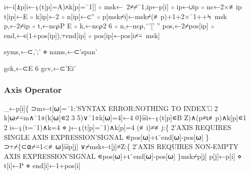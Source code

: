 \documentclass{article}%
\begin{document}
\nwenddocs{}\endmoddef\nwstartdeflinemarkup{}\nwenddeflinemarkup
i←i[⍋p[i←⍸(t[p]=A)∧k[p]=¯1]] ⋄ msk←~2≠⌿¯1,ip←p[i] ⋄ ip←∪ip ⋄ nc←2×≢ip
t[ip]←E ⋄ k[ip]←2 ⋄ n[ip]←⊂'' ⋄ p[msk⌿i]←msk⌿(≢p)+1+2×¯1++⍀~msk
p,←2⌿ip ⋄ t,←nc⍴P E ⋄ k,←nc⍴2 6 ⋄ n,←nc⍴,¨'[' ''
pos,←2⌿pos[ip] ⋄ end,←∊(1+pos[ip]),⍪end[ip] ⋄ pos[ip]←pos[i⌿⍨~msk]
\nwendcode{}\nwdocspar

\nwenddocs{}\plusendmoddef\nwstartdeflinemarkup{}\nwenddeflinemarkup
syms,←⊂,';' ⋄ nams,←⊂'span'
\nwendcode{}\nwdocspar

\nwenddocs{}\plusendmoddef\nwstartdeflinemarkup{}\nwenddeflinemarkup
gck,←⊂E 6
gcv,←⊂'Ei'
\nwendcode{}\nwdocspar


\subsubsection{Axis Operator}

\nwenddocs{}\endmoddef\nwstartdeflinemarkup{}\nwenddeflinemarkup
_←p[i]\{
        ⊃m←t[⍵]=¯1:'SYNTAX ERROR:NOTHING TO INDEX'⎕ 2
        k[⍵⌿⍨m∧¯1⌽(k[⍵]∊2 3 5)∨¯1⌽k[⍵]=4]←4
0\}⌸i←⍸(t[p]∊B Z)∧(p≠⍳≢p)∧k[p]∊1 2
i←⍸(t=¯1)∧k=4 ⋄ j←⍸(t[p]=¯1)∧k[p]=4
(≢i)≠≢j:\{
        2'AXIS REQUIRES SINGLE AXIS EXPRESSION'SIGNAL ∊pos[⍵]+⍳¨end[⍵]-pos[⍵]
\}⊃⍪⌿\{⊂⍺⌿⍨1<≢⍵\}⌸p[j]
∨⌿msk←t[j]≠Z:\{
        2'AXIS REQUIRES NON-EMPTY AXIS EXPRESSION'SIGNAL ∊pos[⍵]+⍳¨end[⍵]-pos[⍵]
\}msk⌿p[j]
p[j]←p[i] ⋄ t[i]←P ⋄ end[i]←1+pos[i]
\nwendcode{}\nwdocspar
\end{document}
